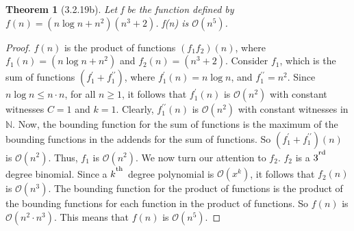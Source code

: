 \documentclass[a4paper, 12pt]{article}
\theoremstyle{plain}
\newtheorem*{theorem*}{Theorem}
\begin{document}
	
	\begin{theorem*}[3.2.19b]
		Let f be the function defined by \newline $f(n) = (n \log n + n^{2})(n^{3} + 2)$. f(n) is $\mathcal{O}(n^{5})$.
	\end{theorem*}
	
	\begin{proof}
		$f(n)$ is the product of functions $(f_1 f_2)(n)$, where $f_1(n) = (n \log n + n^{2})$ and $f_2(n) = (n^{3} + 2)$. \newline \indent Consider $f_1$, which is the sum of functions $(f_1^\prime + f_1^{\prime\prime})$, where $f_1^\prime(n) = n \log n$, and $f_1^{\prime\prime} = n^{2}$. Since $n \log n \le n \cdot n$, for all $n \ge 1$, it follows that $f_1^\prime(n)$ is $\mathcal{O}(n^{2})$ with constant witnesses $C = 1$ and $k = 1$. Clearly, $f_1^{\prime\prime}(n)$ is $\mathcal{O}(n^{2})$ with constant witnesses in $\mathbb{N}$. Now, the bounding function for the sum of functions is the maximum of the bounding functions in the addends for the sum of functions. So $(f_1^\prime + f_1^{\prime\prime})(n)$ is $\mathcal{O}(n^{2})$. Thus, $f_1$ is $\mathcal{O}(n^{2})$.
		\newline \indent We now turn our attention to $f_2$. $f_2$ is a $3^\textsuperscript{rd}$ degree binomial. Since a $k^\textsuperscript{th}$ degree polynomial is $\mathcal{O}(x^{k})$, it follows that $f_2(n)$ is $\mathcal{O}(n^{3})$.
		\newline \indent The bounding function for the product of functions is the product of the bounding functions for each function in the product of functions. So $f(n)$ is $\mathcal{O}(n^{2} \cdot n^{3})$. This means that $f(n)$ is $\mathcal{O}(n^{5})$.
	\end{proof}
\end{document}
